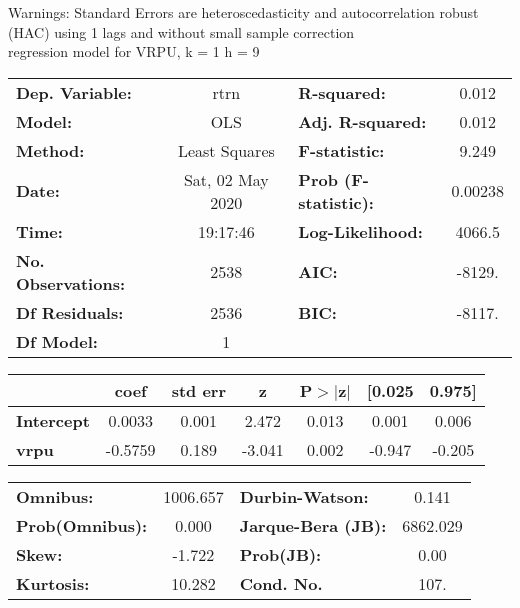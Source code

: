 Warnings: \newline
 [1] Standard Errors are heteroscedasticity and autocorrelation robust (HAC) using 1 lags and without small sample correction\\ 

regression model for VRPU, k = 1 h = 9\begin{center}
\begin{tabular}{lclc}
\toprule
\textbf{Dep. Variable:}    &       rtrn       & \textbf{  R-squared:         } &     0.012   \\
\textbf{Model:}            &       OLS        & \textbf{  Adj. R-squared:    } &     0.012   \\
\textbf{Method:}           &  Least Squares   & \textbf{  F-statistic:       } &     9.249   \\
\textbf{Date:}             & Sat, 02 May 2020 & \textbf{  Prob (F-statistic):} &  0.00238    \\
\textbf{Time:}             &     19:17:46     & \textbf{  Log-Likelihood:    } &    4066.5   \\
\textbf{No. Observations:} &        2538      & \textbf{  AIC:               } &    -8129.   \\
\textbf{Df Residuals:}     &        2536      & \textbf{  BIC:               } &    -8117.   \\
\textbf{Df Model:}         &           1      & \textbf{                     } &             \\
\bottomrule
\end{tabular}
\begin{tabular}{lcccccc}
                   & \textbf{coef} & \textbf{std err} & \textbf{z} & \textbf{P$> |$z$|$} & \textbf{[0.025} & \textbf{0.975]}  \\
\midrule
\textbf{Intercept} &       0.0033  &        0.001     &     2.472  &         0.013        &        0.001    &        0.006     \\
\textbf{vrpu}      &      -0.5759  &        0.189     &    -3.041  &         0.002        &       -0.947    &       -0.205     \\
\bottomrule
\end{tabular}
\begin{tabular}{lclc}
\textbf{Omnibus:}       & 1006.657 & \textbf{  Durbin-Watson:     } &    0.141  \\
\textbf{Prob(Omnibus):} &   0.000  & \textbf{  Jarque-Bera (JB):  } & 6862.029  \\
\textbf{Skew:}          &  -1.722  & \textbf{  Prob(JB):          } &     0.00  \\
\textbf{Kurtosis:}      &  10.282  & \textbf{  Cond. No.          } &     107.  \\
\bottomrule
\end{tabular}
\end{center}

